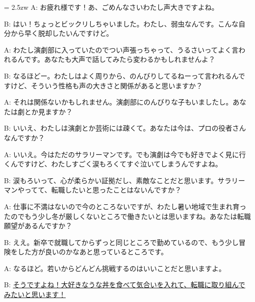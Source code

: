 \documentclass[11pt]{amsart}
\title{}
\author{}
\newenvironment{hangall}[1]{\hangindent = 2.5zw\everypar{\hangindent = 2.5zw}}{}
\begin{document}
\maketitle
\begin{hangall}{}%
A: お疲れ様です！あ、ごめんなさいわたし声大きですよね。

B: はい！ちょっとビックリしちゃいました。わたし、弱虫なんです。こんな自分から早く脱却したいんですけど。

A: わたし演劇部に入っていたのでつい声張っちゃって、うるさいってよく言われるんです。あなたも大声で話してみたら変わるかもしれませんよ？

B: なるほどー。わたしはよく周りから、のんびりしてるねーって言われるんですけど、そういう性格も声の大きさと関係があると思いますか？

A: それは関係ないかもしれません。演劇部にのんびりな子もいましたし。あなたは劇とか見ますか？

B: いいえ、わたしは演劇とか芸術には疎くて。あなたは今は、プロの役者さんなんですか？

A: いいえ。今はただのサラリーマンです。でも演劇は今でも好きでよく見に行くんですけど、わたしすごく涙もろくてすぐ泣いてしまうんですよね。

B: 涙もろいって、心が柔らかい証拠だし、素敵なことだと思います。サラリーマンやってて、転職したいと思ったことはないんですか？

A: 仕事に不満はないので今のところないですが、わたし暑い地域で生まれ育ったのでもう少し冬が厳しくないところで働きたいとは思いますね。あなたは転職願望があるんですか？

B: ええ。新卒で就職してからずっと同じところで勤めているので、もう少し冒険をした方が良いのかなあと思っているところです。

A: なるほど。若いからどんどん挑戦するのはいいことだと思いますよ。

B: \ul{そうですよね！大好きなうな丼を食べて気合いを入れて、転職に取り組んでみたいと思います！}\end{hangall}
\end{document}
